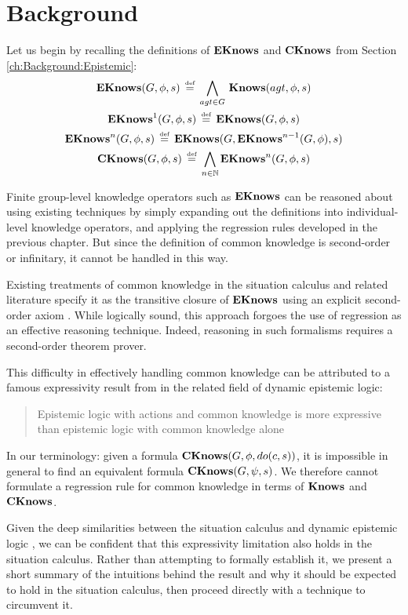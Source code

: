 \section{Background\label{sec:CKnowledge:Background}}

Let us begin by recalling the definitions of $\mathbf{EKnows}$ and $\mathbf{CKnows}$
from Section \ref{ch:Background:Epistemic}:\begin{gather*}
\mathbf{EKnows}(G,\phi,s)\,\stackrel{\mbox{\tiny def}}{=}\,\bigwedge_{agt\in G}\,\mathbf{Knows}(agt,\phi,s)\\
\mathbf{EKnows}^{1}(G,\phi,s)\,\stackrel{\mbox{\tiny def}}{=}\,\mathbf{EKnows}(G,\phi,s)\\
\mathbf{EKnows}^{n}(G,\phi,s)\,\stackrel{\mbox{\tiny def}}{=}\,\mathbf{EKnows}(G,\mathbf{EKnows}^{n-1}(G,\phi),s)\\
\mathbf{CKnows}(G,\phi,s)\,\stackrel{\mbox{\tiny def}}{=}\,\bigwedge_{n\in\mathbb{N}}\mathbf{EKnows}^{n}(G,\phi,s)\end{gather*}


Finite group-level knowledge operators such as $\mathbf{EKnows}$ can be reasoned
about using existing techniques by simply expanding out the definitions
into individual-level knowledge operators, and applying the regression
rules developed in the previous chapter. But since the definition
of common knowledge is second-order or infinitary, it cannot be handled
in this way.

Existing treatments of common knowledge in the situation calculus
and related literature specify it as the transitive closure of $\mathbf{EKnows}$
using an explicit second-order axiom \citep{davis05fo_ma_theory,ghaderi07sc_joint_ability}.
While logically sound, this approach forgoes the use of regression
as an effective reasoning technique. Indeed, reasoning in such formalisms
requires a second-order theorem prover.

This difficulty in effectively handling common knowledge can be attributed
to a famous expressivity result from \citet{baltag98pa_ck} in the
related field of dynamic epistemic logic:

\begin{quote}
Epistemic logic with actions and common knowledge is more expressive
than epistemic logic with common knowledge alone 
\end{quote}
In our terminology: given a formula $\mathbf{CKnows}(G,\phi,do(c,s))$, it
is impossible in general to find an equivalent formula $\mathbf{CKnows}(G,\psi,s)$.
We therefore cannot formulate a regression rule for common knowledge
in terms of $\mathbf{Knows}$ and $\mathbf{CKnows}$.

Given the deep similarities between the situation calculus and dynamic
epistemic logic \citep{vanbentham07ml_sitcalc}, we can be confident
that this expressivity limitation also holds in the situation calculus.
Rather than attempting to formally establish it, we present a short
summary of the intuitions behind the result and why it should be expected
to hold in the situation calculus, then proceed directly with a technique
to circumvent it.

